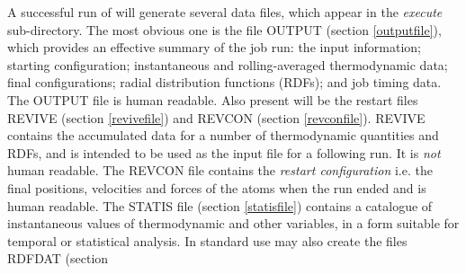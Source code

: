 A successful run of \D{} will generate several data files, which
appear in the {\em execute} sub-directory. The most obvious one is the
file OUTPUT (section \ref{outputfile}), which provides an effective
summary of the job run: the input information; starting configuration;
instantaneous and rolling-averaged thermodynamic data; final
configurations; radial distribution functions (RDFs); and job timing
data. The OUTPUT file is human readable.  Also present will be the
restart files REVIVE (section \ref{revivefile}) and REVCON (section
\ref{revconfile}).  REVIVE contains the accumulated data for a number
of thermodynamic quantities and RDFs, and is intended to be used as
the input file for a following run. It is {\em not} human readable.
The REVCON file contains the {\em restart configuration} i.e. the
final positions, velocities and forces of the atoms when the run ended
and is human readable.  The STATIS file (section \ref{statisfile})
contains a catalogue of instantaneous values of thermodynamic and
other variables, in a form suitable for temporal or statistical
analysis. In standard use \DD{} may also create the files RDFDAT (section
